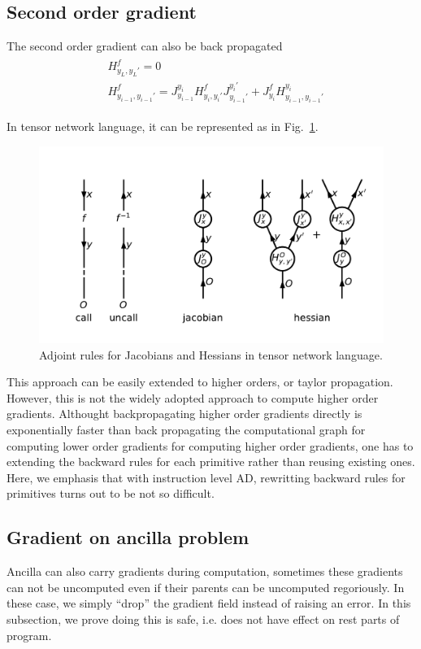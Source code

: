 \documentclass[aps,twocolumn,longbibliography,english,superscriptaddress,prr]{revtex4-1}
\newcommand{\<}{\langle}
\renewcommand{\>}{\rangle}
\newcommand{\Fig}[1]{Fig.~\ref{#1}}
\begin{document}
\subsection{Second order gradient}
The second order gradient can also be back propagated
\begin{align}
    \begin{split}
        &H^f_{y_L,y_L'} = 0\\
        &H^f_{y_{i-1},y_{i-1}'} = J^{y_i}_{y_{i-1}} H^f_{y_i, y_i'} J^{y_i'}_{y_{i-1}'} + J^f_{y_i} H^{y_i}_{y_{i-1}, y_{i-1}'}
    \end{split}
\end{align}

In tensor network language, it can be represented as in \Fig{fig:ad}.
\begin{figure}[h]
    \centerline{\includegraphics[width=\columnwidth,trim={0 1cm 0 1cm},clip]{images/ad.pdf}}
    \caption{Adjoint rules for Jacobians and Hessians in tensor network language.}\label{fig:ad}
\end{figure}

This approach can be easily extended to higher orders, or taylor propagation.
However, this is not the widely adopted approach to compute higher order gradients.
Althought backpropagating higher order gradients directly is exponentially faster than back propagating the computational graph for computing lower order gradients for computing higher order gradients, one has to extending the backward rules for each primitive rather than reusing existing ones.
Here, we emphasis that with instruction level AD, rewritting backward rules for primitives turns out to be not so difficult.

\subsection{Gradient on ancilla problem}
Ancilla can also carry gradients during computation, sometimes these gradients can not be uncomputed even if their parents can be uncomputed regoriously. In these case, we simply ``drop'' the gradient field instead of raising an error. In this subsection, we prove doing this is safe, i.e. does not have effect on rest parts of program.
\end{document}
